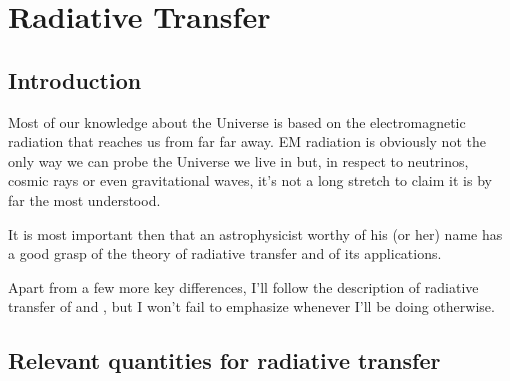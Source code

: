 
\chapter{Radiative Transfer}\label{ch:iii}

\section{Introduction}

Most of our knowledge about the Universe is based on the electromagnetic radiation that reaches us from far far away. EM radiation is obviously not the only way we can probe the Universe we live in but, in respect to neutrinos, cosmic rays or even gravitational waves, it's not a long stretch to claim it is by far the most understood.
\par It is most important then that an astrophysicist worthy of his (or her) name has a good grasp of the theory of radiative transfer and of its applications.
\par Apart from a few more key differences, I'll follow the description of radiative transfer of \cite{choudhuri} and \cite{1986rpa..book.....R}, but I won't fail to emphasize whenever I'll be doing otherwise.

\section{Relevant quantities for radiative transfer}

